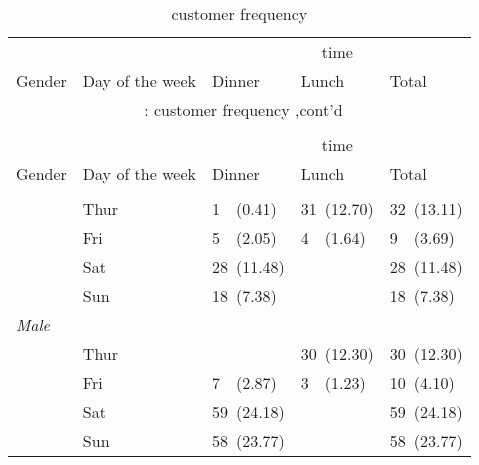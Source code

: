\documentclass{article}
\begin{document}
\newpage
\hypertarget{customer frequency}{} 
\begin{longtable}{lllll}
\caption{customer frequency}\\
\toprule
&&
\multicolumn{ 3 }{c}{ time } \\
\cmidrule(lr){3-5}
Gender & Day of the week & Dinner & Lunch & Total \\
\hline
\endfirsthead
\multicolumn{5}{c}{\tablename~\thetable{}: customer frequency ,cont'd}\\\\
\toprule
&&
\multicolumn{ 3 }{c}{ time } \\
\cmidrule(lr){3-5}
Gender & Day of the week & Dinner & Lunch & Total \\
\hline
\endhead \hline \endfoot \hline

\endlastfoot
\multicolumn{ 4 }{l}{\textit{ Female }}\\
& Thur & 1~~(0.41) & 31~(12.70) & 32~(13.11) \\
 & Fri & 5~~(2.05) & 4~~(1.64) & 9~~(3.69) \\
 & Sat & 28~(11.48) &  & 28~(11.48) \\
 & Sun & 18~(7.38) &  & 18~(7.38) \\
[2ex]
\multicolumn{ 4 }{l}{\textit{ Male }}\\
& Thur &  & 30~(12.30) & 30~(12.30) \\
 & Fri & 7~~(2.87) & 3~~(1.23) & 10~(4.10) \\
 & Sat & 59~(24.18) &  & 59~(24.18) \\
 & Sun & 58~(23.77) &  & 58~(23.77) \\
[2ex]
\end{longtable}
\newpage
\hypertarget{total bill statistics}{} 
\end{document}
